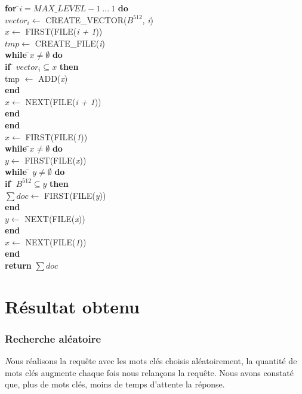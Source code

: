 \begin{flushleft}
\begin{framed}
\begin{tabbing}
			\textbf{for }\=$i = MAX\_LEVEL - 1\ ...\ 1$ \textbf{do}\\
					\> $vector_i \leftarrow$ CREATE\_VECTOR($B^{512}$, \textit{i})\\
					\> $x \leftarrow$ FIRST(FILE(\textit{i + 1}))\\
					\> $tmp \leftarrow$ CREATE\_FILE(\textit{i})\\
					\> \textbf{while }\=$x \neq \emptyset$\textbf{ do}\\
					\> \> \textbf{if }\= $vector_i \subseteq x$\textbf{ then}\\
					\> \> \> tmp $\leftarrow$ ADD(\textit{x})\\
					\> \> \textbf{end}\\
					\> \> $x \leftarrow$ NEXT(FILE(\textit{i + 1}))\\
					\> \textbf{end}\\
			\textbf{end}	\\
			$x \leftarrow$ FIRST(FILE(\textit{1}))\\
			\textbf{while }\=$x \neq \emptyset$\textbf{ do}\\
					\> $y \leftarrow $ FIRST(FILE(\textit{x}))\\
					\> \textbf{while }\= $y \neq \emptyset$\textbf{ do}\\
					\> \> \textbf{if }\= $B^{512} \subseteq y$\textbf{ then}\\
					\> \> \> $\sum doc \leftarrow$ FIRST(FILE(\textit{y}))\\
					\> \> \textbf{end}\\
					\> \> $y \leftarrow$ NEXT(FILE(\textit{x}))\\
					\> \textbf{end}\\
					\> $x \leftarrow$ NEXT(FILE(\textit{1}))\\
			\textbf{end}\\
			\textbf{return} $\sum doc$\\
	    	\end{tabbing}		
	\end{framed}
\end{flushleft}

\chapter{Résultat obtenu}
\subsection{Recherche aléatoire}
	{\huge \itshape N}ous réalisons la requête avec les mots clés choisis aléatoirement, la quantité de mots clés augmente chaque fois nous relançons la requête. Nous avons constaté que, plus de mots clés, moins de temps d'attente la réponse.

